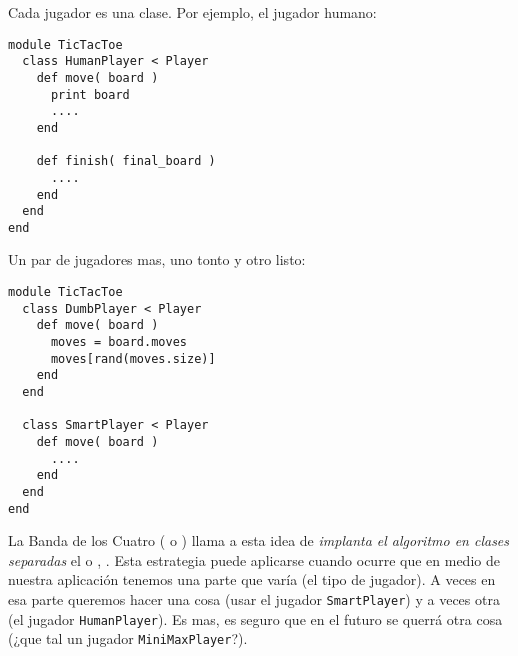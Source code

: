 Cada jugador es una clase. Por ejemplo, el jugador humano:
\begin{verbatim}
module TicTacToe
  class HumanPlayer < Player
    def move( board )
      print board
      ....
    end
    
    def finish( final_board )
      ....
    end
  end
end
\end{verbatim}
Un par de jugadores mas, uno tonto y otro listo:
\begin{verbatim}
module TicTacToe
  class DumbPlayer < Player
    def move( board )
      moves = board.moves
      moves[rand(moves.size)]
    end
  end

  class SmartPlayer < Player
    def move( board )
      ....
    end
  end
end
\end{verbatim}
La Banda de los Cuatro ( o ) 
llama a esta idea de \emph{implanta el algoritmo en clases separadas} el 
 o  \cite{DPR}, \cite{GO4}.
Esta estrategia puede aplicarse cuando ocurre que en medio de nuestra aplicación
tenemos una parte que varía (el tipo de jugador). 
A veces en esa parte queremos  hacer una cosa (usar el jugador \verb|SmartPlayer|) y a veces
otra (el jugador \verb|HumanPlayer|). Es mas, es seguro que en el futuro se querrá
otra cosa (¿que tal un jugador \verb|MiniMaxPlayer|?).
